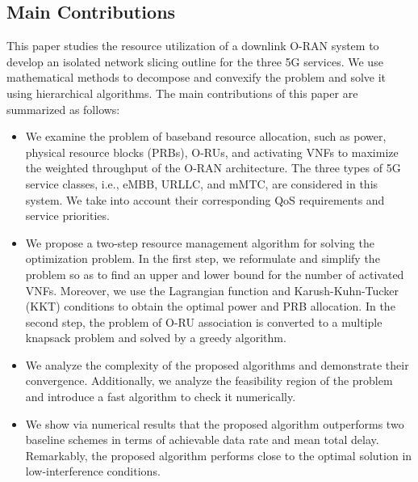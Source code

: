 \documentclass[12pt, letterpaper]{article}
\begin{document}
\subsection{Main Contributions}
This paper studies the resource utilization of a downlink O-RAN system to develop an isolated network slicing outline for the three 5G services.
We use mathematical methods to decompose and convexify the problem and solve it using hierarchical algorithms.
 The main contributions of this paper are summarized as follows:
\begin{itemize}
\item We examine the problem of baseband resource allocation, such as power, physical resource blocks (PRBs), O-RUs, and activating VNFs to maximize the weighted throughput of the O-RAN architecture. The three types of 5G service classes, i.e., eMBB, URLLC, and mMTC, are considered in this system. We take into account their corresponding QoS requirements and service priorities.
\item We propose a two-step resource management algorithm for solving the optimization problem.
In the first step, we reformulate and simplify the problem so as to find an upper and lower bound for the number of activated VNFs. Moreover, we use the Lagrangian function and Karush-Kuhn-Tucker (KKT) conditions to obtain the optimal power and PRB allocation. In the second step, the problem of O-RU association is converted to a multiple knapsack problem and solved by a greedy algorithm.
\item We analyze the complexity of the proposed algorithms and demonstrate their convergence. Additionally, we analyze the feasibility region of the problem and introduce a fast algorithm to check it numerically.
\item We show via numerical results that the proposed algorithm outperforms two baseline schemes in terms of achievable data rate and mean total delay. Remarkably, the proposed algorithm performs close to the optimal solution in low-interference conditions.
\end{itemize}
\end{document}
